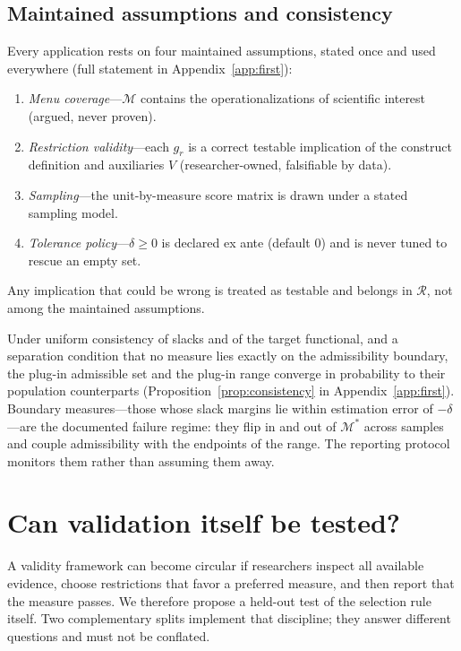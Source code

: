 \documentclass[10pt,letterpaper]{article}
\newcommand{\M}{\ensuremath{\mathcal{M}}}
\newcommand{\Rset}{\mathcal{R}}
\begin{document}
\subsection{Maintained assumptions and consistency}
Every application rests on four maintained assumptions, stated once and used everywhere (full statement in Appendix~\ref{app:first}):
\begin{enumerate}[label=(A\arabic*)]
\item \emph{Menu coverage}---$\M$ contains the operationalizations of scientific interest (argued, never proven).
\item \emph{Restriction validity}---each $g_r$ is a correct testable implication of the construct definition and auxiliaries $V$ (researcher-owned, falsifiable by data).
\item \emph{Sampling}---the unit-by-measure score matrix is drawn under a stated sampling model.
\item \emph{Tolerance policy}---$\delta\ge 0$ is declared ex ante (default $0$) and is never tuned to rescue an empty set.
\end{enumerate}
Any implication that could be wrong is treated as testable and belongs in $\Rset$, not among the maintained assumptions.

Under uniform consistency of slacks and of the target functional, and a separation condition that no measure lies exactly on the admissibility boundary, the plug-in admissible set and the plug-in range converge in probability to their population counterparts (Proposition~\ref{prop:consistency} in Appendix~\ref{app:first}).
Boundary measures---those whose slack margins lie within estimation error of $-\delta$---are the documented failure regime: they flip in and out of $\M^*$ across samples and couple admissibility with the endpoints of the range.
The reporting protocol monitors them rather than assuming them away.

\section{Can validation itself be tested?}
\label{sec:holdout}
A validity framework can become circular if researchers inspect all available evidence, choose restrictions that favor a preferred measure, and then report that the measure passes.
We therefore propose a held-out test of the selection rule itself.
Two complementary splits implement that discipline; they answer different questions and must not be conflated.
\end{document}
